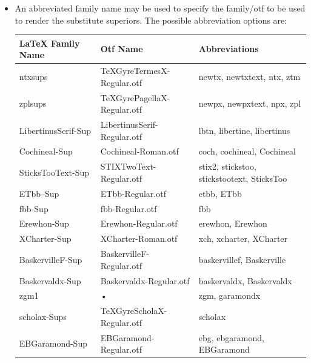 \documentclass[11pt]{article}
\begin{document}
\begin{itemize}
\begin{itemize}
\item
An abbreviated family name may be used to specify the family/otf to be used to render the substitute superiors. The possible abbreviation options are:
\begin{center}
  \begin{tabular}{@{} lll @{}}
    \toprule
    LaTeX Family Name & Otf Name & Abbreviations \\
    \midrule
    ntxsups & TeXGyreTermesX-Regular.otf & newtx, newtxtext, ntx, ztm \\
    zplsups & TeXGyrePagellaX-Regular.otf & newpx, newpxtext, npx, zpl \\
    LibertinusSerif-Sup & LibertinusSerif-Regular.otf & lbtn, libertine, libertinus \\
    Cochineal-Sup & Cochineal-Roman.otf & coch, cochineal, Cochineal \\
    SticksTooText-Sup & STIXTwoText-Regular.otf & stix2, stickstoo, stickstootext, SticksToo \\
    ETbb--Sup & ETbb-Regular.otf & etbb, ETbb \\
    fbb-Sup & fbb-Regular.otf & fbb \\
    Erewhon-Sup & Erewhon-Regular.otf & erewhon, Erewhon\\
    XCharter-Sup & XCharter-Roman.otf & xch, xcharter, XCharter \\
    BaskervilleF-Sup & BaskervilleF-Regular.otf & baskervillef, Baskerville\\
    Baskervaldx-Sup & Baskervaldx-Regular.otf & baskervaldx, Baskervaldx \\
    zgm1 & • & zgm, garamondx \\
    scholax-Sups & TeXGyreScholaX-Regular.otf & scholax \\
    EBGaramond-Sup & EBGaramond-Regular.otf & ebg, ebgaramond, EBGaramond \\
    \bottomrule
  \end{tabular}
\end{center}
\end{itemize}
\end{itemize}
\end{document}
